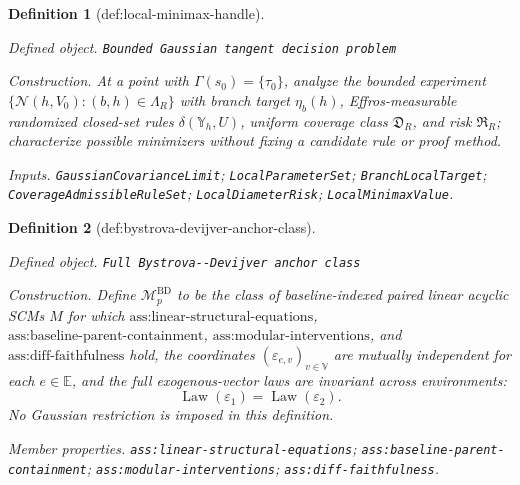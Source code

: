 \documentclass{article}
\newtheorem{definition}{Definition}
\begin{document}
\begin{definition}[def:local-minimax-handle]\label{def:local-minimax-handle}
\par\smallskip\noindent\emph{Defined object.} \texttt{Bounded Gaussian tangent decision problem}
\par\smallskip\noindent\emph{Construction.} At a point with \(\Gamma(s_0)=\{\tau_0\}\), analyze the bounded experiment \(\{\mathcal N(h,V_0):(b,h)\in\Lambda_R\}\) with branch target \(\eta_b(h)\), Effros-measurable randomized closed-set rules \(\delta(\mathbb Y_h,U)\), uniform coverage class \(\mathfrak D_R\), and risk \(\mathfrak R_R\); characterize possible minimizers without fixing a candidate rule or proof method.
\par\smallskip\noindent\emph{Inputs.} \texttt{GaussianCovarianceLimit}; \texttt{LocalParameterSet}; \texttt{BranchLocalTarget}; \texttt{CoverageAdmissibleRuleSet}; \texttt{LocalDiameterRisk}; \texttt{LocalMinimaxValue}.
\end{definition}

\begin{definition}[def:bystrova-devijver-anchor-class]\label{def:bystrova-devijver-anchor-class}
\par\smallskip\noindent\emph{Defined object.} \texttt{Full Bystrova-\allowbreak{}-\allowbreak{}Devijver anchor class}
\par\smallskip\noindent\emph{Construction.} Define \(\mathcal M_p^{\mathrm{BD}}\) to be the class of baseline-indexed paired linear acyclic SCMs \(M\) for which \(\text{ass:linear-structural-equations}\), \(\text{ass:baseline-parent-containment}\), \(\text{ass:modular-interventions}\), and \(\text{ass:diff-faithfulness}\) hold, the coordinates \((\varepsilon_{e,v})_{v\in\mathbb V}\) are mutually independent for each \(e\in\mathbb E\), and the full exogenous-vector laws are invariant across environments:
\[
 \operatorname{Law}(\varepsilon_1)=\operatorname{Law}(\varepsilon_2).
\]
No Gaussian restriction is imposed in this definition.
\par\smallskip\noindent\emph{Member properties.} \texttt{ass:\allowbreak{}linear-\allowbreak{}structural-\allowbreak{}equations}; \texttt{ass:\allowbreak{}baseline-\allowbreak{}parent-\allowbreak{}containment}; \texttt{ass:\allowbreak{}modular-\allowbreak{}interventions}; \texttt{ass:\allowbreak{}diff-\allowbreak{}faithfulness}.
\end{definition}
\end{document}
